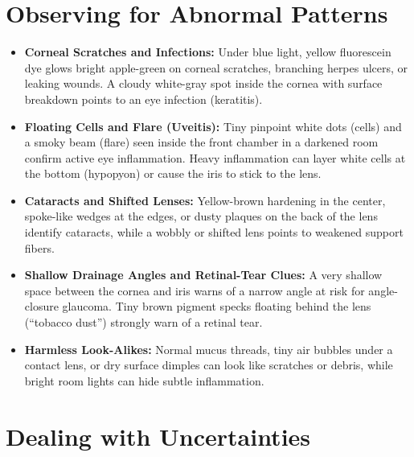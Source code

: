\section{Observing for Abnormal Patterns}

\begin{itemize}
    \item \textbf{Corneal Scratches and Infections:} Under blue light, yellow fluorescein dye glows bright apple-green on corneal scratches, branching herpes ulcers, or leaking wounds. A cloudy white-gray spot inside the cornea with surface breakdown points to an eye infection (keratitis).
    \item \textbf{Floating Cells and Flare (Uveitis):} Tiny pinpoint white dots (cells) and a smoky beam (flare) seen inside the front chamber in a darkened room confirm active eye inflammation. Heavy inflammation can layer white cells at the bottom (hypopyon) or cause the iris to stick to the lens.
    \item \textbf{Cataracts and Shifted Lenses:} Yellow-brown hardening in the center, spoke-like wedges at the edges, or dusty plaques on the back of the lens identify cataracts, while a wobbly or shifted lens points to weakened support fibers.
    \item \textbf{Shallow Drainage Angles and Retinal-Tear Clues:} A very shallow space between the cornea and iris warns of a narrow angle at risk for angle-closure glaucoma. Tiny brown pigment specks floating behind the lens (``tobacco dust'') strongly warn of a retinal tear.
    \item \textbf{Harmless Look-Alikes:} Normal mucus threads, tiny air bubbles under a contact lens, or dry surface dimples can look like scratches or debris, while bright room lights can hide subtle inflammation.
\end{itemize}

\section{Dealing with Uncertainties}


